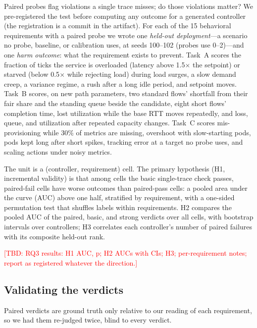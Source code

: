 \documentclass[sigconf,review,anonymous]{acmart}
\newcommand{\tbd}[1]{\textcolor{red}{[TBD: #1]}}
\begin{document}
	Paired probes flag violations a single trace misses; do those violations
	matter? We pre-registered the test before computing any outcome for a
	generated controller (the registration is a commit in the artifact).
	For each of the 15 behavioral requirements with a paired probe we wrote
	one \emph{held-out deployment}---a scenario no probe, baseline, or
	calibration uses, at seeds 100--102 (probes use 0--2)---and one
	\emph{harm outcome}: what the requirement exists to prevent. Task~A
	scores the fraction of ticks the service is overloaded (latency above
	1.5$\times$ the setpoint) or starved (below 0.5$\times$ while rejecting
	load) during load surges, a slow demand creep, a variance regime, a rush
	after a long idle period, and setpoint moves. Task~B scores, on new path
	parameters, two standard flows' shortfall from their fair share and the
	standing queue beside the candidate, eight short flows' completion time,
	lost utilization while the base RTT moves repeatedly, and loss, queue,
	and utilization after repeated capacity changes. Task~C scores
	mis-provisioning while 30\% of metrics are missing, overshoot with
	slow-starting pods, pods kept long after short spikes, tracking error at
	a target no probe uses, and scaling actions under noisy metrics.

	The unit is a (controller, requirement) cell. The primary hypothesis
	(H1, incremental validity) is that among cells the basic single-trace
	check passes, paired-fail cells have worse outcomes than paired-pass
	cells: a pooled area under the curve (AUC) above one half, stratified by
	requirement, with a one-sided permutation test that shuffles labels
	within requirements. H2 compares the pooled AUC of the paired, basic, and
	strong verdicts over all cells, with bootstrap intervals over
	controllers; H3 correlates each controller's number of paired failures
	with its composite held-out rank.

	\tbd{RQ3 results: H1 AUC, p; H2 AUCs with CIs; H3; per-requirement
	notes; report as registered whatever the direction.}

	\subsection{Validating the verdicts}
	\label{sec:validation}

	Paired verdicts are ground truth only relative to our reading of each
	requirement, so we had them re-judged twice, blind to every verdict.
\end{document}

